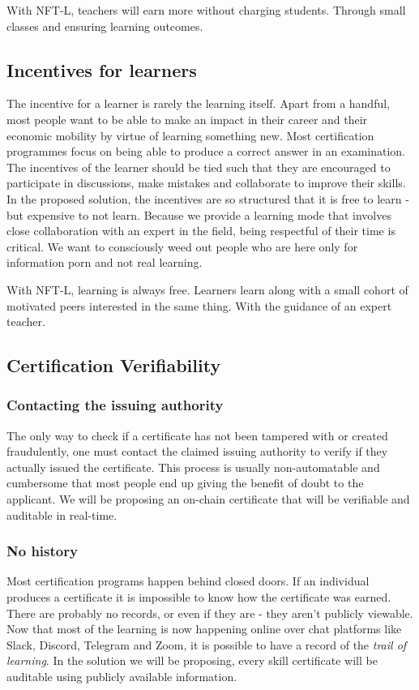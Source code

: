 \documentclass{article}
\begin{document}
       With NFT-L, teachers will earn more without charging students. Through small classes and ensuring learning outcomes.
     
       
    \subsection{Incentives for learners}
      The incentive for a learner is rarely the learning itself. Apart from a handful, most people want to be able to make an impact in their career and their economic mobility by virtue of learning something new. 
      Most certification programmes focus on being able to produce a correct answer in an examination. The incentives of the learner should be tied such that they are encouraged to participate in discussions, make mistakes and collaborate to improve their skills.
      \break
      In the proposed solution, the incentives are so structured that it is free to learn - but expensive to not learn. Because we provide a learning mode that involves close collaboration with an expert in the field, being respectful of their time is critical. 
      We want to consciously weed out people who are here only for information porn and not real learning.
      
      With NFT-L, learning is always free. Learners learn along with a small cohort of motivated peers interested in the same thing. With the guidance of an expert teacher.
    \subsection{Certification Verifiability}
      \subsubsection{Contacting the issuing authority}
        The only way to check if a certificate has not been tampered with or created fraudulently, one must contact the claimed issuing authority to verify if they actually issued the certificate. 
        This process is usually non-automatable and cumbersome that most people end up giving the benefit of doubt to the applicant. 
        \break
        We will be proposing an on-chain certificate that will be verifiable and auditable in real-time.
      \subsubsection{No history}
        Most certification programs happen behind closed doors. If an individual produces a certificate it is impossible to know how the certificate was earned. There are probably no records, or even if they are - they aren't publicly viewable. 
        \break
        Now that most of the learning is now happening online over chat platforms like Slack, Discord, Telegram and Zoom, it is possible to have a record of the \textit{trail of learning}. In the solution we will be proposing, every skill certificate will be auditable using publicly available information.
\end{document}
